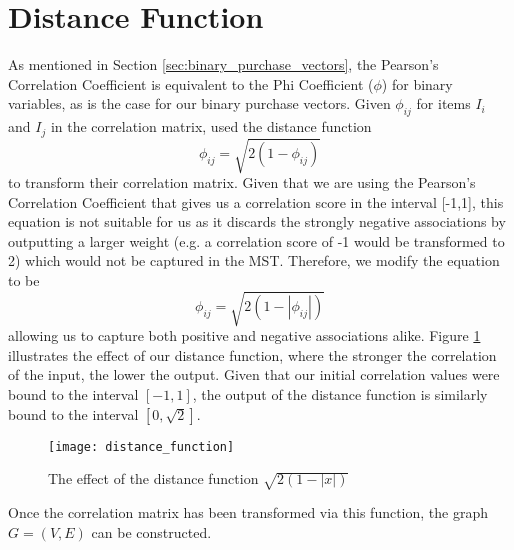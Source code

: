 \section{Distance Function}
\label{sec:distance}
As mentioned in Section \ref{sec:binary_purchase_vectors}, the Pearson's Correlation Coefficient is equivalent to the Phi Coefficient ($\phi$) for binary variables, as is the case for our binary purchase vectors. Given $\phi_{ij}$ for items $I_i$ and $I_j$ in the correlation matrix,  used the distance function
\[
\phi_{ij} = \sqrt{2(1-\phi_{ij})}
\]
to transform their correlation matrix. Given that we are using the Pearson's Correlation Coefficient that gives us a correlation score in the interval [-1,1], this equation is not suitable for us as it discards the strongly negative associations by outputting a larger weight (e.g. a correlation score of -1 would be transformed to 2) which would not be captured in the MST. Therefore, we modify the equation to be
\[
\phi_{ij} = \sqrt{2(1-|\phi_{ij}|)}
\]
allowing us to capture both positive and negative associations alike. Figure \ref{fig:distance_function} illustrates the effect of our distance function, where the stronger the correlation of the input, the lower the output. Given that our initial correlation values were bound to the interval $[-1,1]$, the output of the distance function is similarly bound to the interval $[0, \sqrt{2}]$.
\begin{figure}[H]
\centering
\texttt{[image: distance\_function]}
\label{fig:distance_function}
\caption{The effect of the distance function $\sqrt{2(1-|x|)}$}
\end{figure}
\noindent Once the correlation matrix has been transformed via this function, the graph $G=(V,E)$ can be constructed.




